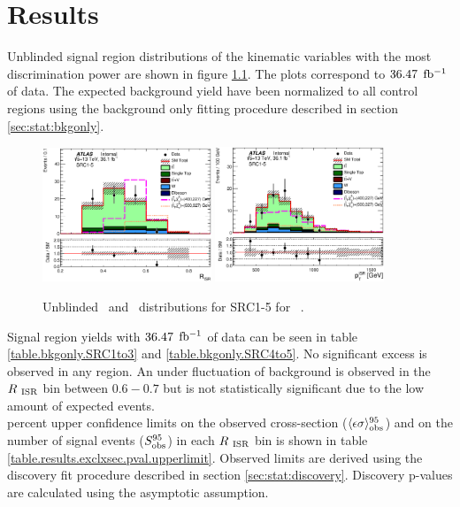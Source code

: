 \chapter{Results}
\label{chap:Results}

\indent Unblinded signal region distributions of the kinematic variables with the most discrimination power are shown in figure \ref{fig:SRCUnblined}.  The plots correspond to $36.47$ $\mbox{fb$^{-1}$}$ of data.  The expected background yield have been normalized to all control regions using the background only fitting procedure described in section \ref{sec:stat:bkgonly}.  \\

\begin{figure}[!hp] 
\begin{center}
\includegraphics[width=0.45\textwidth]{figures/SRC/CA_RISR_SRC1_5}
\includegraphics[width=0.45\textwidth]{figures/SRC/CA_PTISR_SRC1_5}
\caption{Unblinded \rISR\ and \pTISR\ distributions for SRC1-5 for \intlumi\ \ifb.}
\label{fig:SRCUnblined}
\end{center}
\end{figure}

\indent Signal region yields with $36.47$ $\mbox{fb$^{-1}$}$ of data can be seen in table \ref{table.bkgonly.SRC1to3} and \ref{table.bkgonly.SRC4to5}.  No significant excess is observed in any region.  An under fluctuation of background is observed in the $R_{~\mathrm{ISR}}$ bin between $0.6-0.7$ but is not statistically significant due to the low amount of expected events.  \\




 percent upper confidence limits on the observed cross-section ($\langle\epsilon\sigma\rangle_{\rm obs}^{95}$) and on the number of signal events ($S_{\rm obs}^{95}$) in each $R_{~\mathrm{ISR}}$ bin is shown in table \ref{table.results.exclxsec.pval.upperlimit}.  Observed limits are derived using the discovery fit procedure described in section \ref{sec:stat:discovery}.  Discovery p-values are calculated using the asymptotic assumption.  \\

